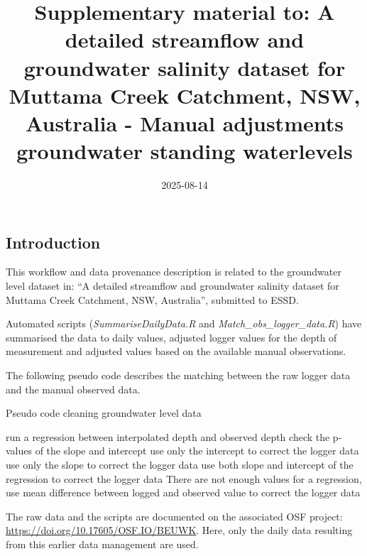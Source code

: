 \documentclass[
]{article}
\title{Supplementary material to: A detailed streamflow and groundwater
salinity dataset for Muttama Creek Catchment, NSW, Australia - Manual
adjustments groundwater standing waterlevels}
\author{}
\date{\vspace{-2.5em}2025-08-14}
\begin{document}
\maketitle

\subsection{Introduction}\label{introduction}

This workflow and data provenance description is related to the
groundwater level dataset in: ``A detailed streamflow and groundwater
salinity dataset for Muttama Creek Catchment, NSW, Australia'',
submitted to ESSD.

Automated scripts (\emph{SummariseDailyData.R} and
\emph{Match\_obs\_logger\_data.R}) have summarised the data to daily
values, adjusted logger values for the depth of measurement and adjusted
values based on the available manual observations.

The following pseudo code describes the matching between the raw logger
data and the manual observed data.

\begin{algorithm}
\caption{Pseudo code cleaning groundwater level data}
\label{pseudocode}
\begin{algorithmic}
        \STATE run a regression between interpolated depth and observed depth  
        \STATE check the p-values of the slope and intercept
                \STATE  use only the intercept to correct the logger data
        \ELSE
                        \STATE use only the slope to correct the logger data
                \ELSE
                       \STATE use both slope and intercept of the regression to correct the logger data
                \ENDIF
        \ENDIF
\ELSE
        \STATE There are not enough values for a regression, use mean difference between logged and observed value to correct the logger data
\ENDIF
\end{algorithmic}
\end{algorithm}

The raw data and the scripts are documented on the associated OSF
project: \url{https://doi.org/10.17605/OSF.IO/BEUWK}. Here, only the
daily data resulting from this earlier data management are used.
\end{document}
